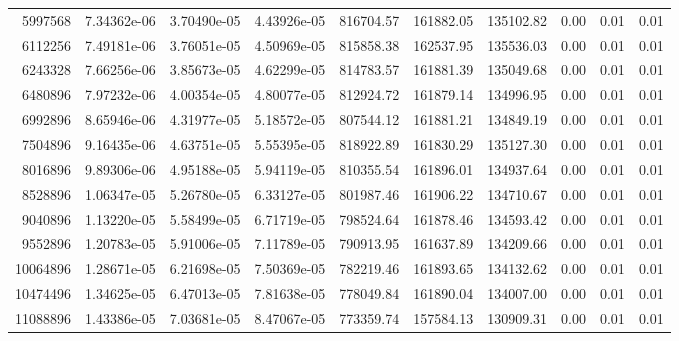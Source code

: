 \begin{table*}[htbp]
\begin{tabular}{r r r r r r r r r r}
5997568 & 7.34362e-06 & 3.70490e-05 & 4.43926e-05 & 816704.57 & 161882.05 & 135102.82 & 0.00 & 0.01 & 0.01 \\
6112256 & 7.49181e-06 & 3.76051e-05 & 4.50969e-05 & 815858.38 & 162537.95 & 135536.03 & 0.00 & 0.01 & 0.01 \\
6243328 & 7.66256e-06 & 3.85673e-05 & 4.62299e-05 & 814783.57 & 161881.39 & 135049.68 & 0.00 & 0.01 & 0.01 \\
6480896 & 7.97232e-06 & 4.00354e-05 & 4.80077e-05 & 812924.72 & 161879.14 & 134996.95 & 0.00 & 0.01 & 0.01 \\
6992896 & 8.65946e-06 & 4.31977e-05 & 5.18572e-05 & 807544.12 & 161881.21 & 134849.19 & 0.00 & 0.01 & 0.01 \\
7504896 & 9.16435e-06 & 4.63751e-05 & 5.55395e-05 & 818922.89 & 161830.29 & 135127.30 & 0.00 & 0.01 & 0.01 \\
8016896 & 9.89306e-06 & 4.95188e-05 & 5.94119e-05 & 810355.54 & 161896.01 & 134937.64 & 0.00 & 0.01 & 0.01 \\
8528896 & 1.06347e-05 & 5.26780e-05 & 6.33127e-05 & 801987.46 & 161906.22 & 134710.67 & 0.00 & 0.01 & 0.01 \\
9040896 & 1.13220e-05 & 5.58499e-05 & 6.71719e-05 & 798524.64 & 161878.46 & 134593.42 & 0.00 & 0.01 & 0.01 \\
9552896 & 1.20783e-05 & 5.91006e-05 & 7.11789e-05 & 790913.95 & 161637.89 & 134209.66 & 0.00 & 0.01 & 0.01 \\
10064896 & 1.28671e-05 & 6.21698e-05 & 7.50369e-05 & 782219.46 & 161893.65 & 134132.62 & 0.00 & 0.01 & 0.01 \\
10474496 & 1.34625e-05 & 6.47013e-05 & 7.81638e-05 & 778049.84 & 161890.04 & 134007.00 & 0.00 & 0.01 & 0.01 \\
11088896 & 1.43386e-05 & 7.03681e-05 & 8.47067e-05 & 773359.74 & 157584.13 & 130909.31 & 0.00 & 0.01 & 0.01 \\
\hline
\end{tabular}
\label{tab:performance_metrics}
\end{table*}
